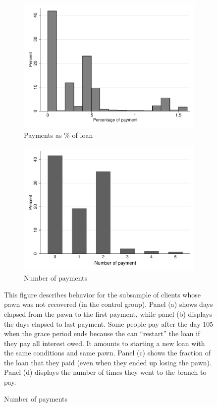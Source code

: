 \documentclass[11pt]{article}
\begin{document}
\begin{figure}[H]
\begin{center}
        \begin{subfigure}{0.40\textwidth}
        \caption{Payments as \% of loan}
        \centering
        \includegraphics[width=\textwidth]{Figuras/hist_percpay_default.pdf}
    \end{subfigure}
    \begin{subfigure}{0.40\textwidth}
        \caption{Number of payments}
        \centering
        \includegraphics[width=\textwidth]{Figuras/hist_numpay_default.pdf}
    \end{subfigure}
    \end{center}
        \scriptsize 
        This figure describes behavior for the subsample of clients whose pawn was not recovered (in the control group).  Panel (a) shows days elapsed from the pawn to the first payment, while panel (b) displays the days elapsed to last payment. Some people pay after the day 105 when the grace period ends because the can ``restart'' the loan if they pay all interest owed. It amounts to starting a new loan with the same conditions and same pawn. Panel (c) shows the fraction of the loan that they paid (even when they ended up losing the pawn). Panel (d) displays the number of times they went to the branch to pay.      
\end{figure}
\end{document}
